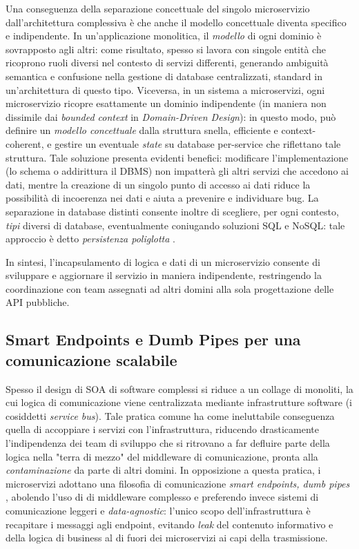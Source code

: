 Una conseguenza della separazione concettuale del singolo microservizio dall'architettura complessiva è che anche il modello concettuale diventa specifico e indipendente. In un'applicazione monolitica, il \emph{modello} di ogni dominio è sovrapposto agli altri: come risultato, spesso si lavora con singole entità che ricoprono ruoli diversi nel contesto di servizi differenti, generando ambiguità semantica e confusione nella gestione di database centralizzati, standard in un'architettura di questo tipo.
Viceversa, in un sistema a microservizi, ogni microservizio ricopre esattamente un dominio indipendente (in maniera non dissimile dai \emph{bounded context} in \emph{Domain-Driven Design}): in questo modo, può definire un \emph{modello concettuale} dalla struttura snella, efficiente e context-coherent, e gestire un eventuale \emph{state} su database per-service che riflettano tale struttura.
Tale soluzione presenta evidenti benefici: modificare l'implementazione (lo schema o addirittura il DBMS) non impatterà gli altri servizi che accedono ai dati, mentre la creazione di un singolo punto di accesso ai dati riduce la possibilità di incoerenza nei dati e aiuta a prevenire e individuare bug.
La separazione in database distinti consente inoltre di scegliere, per ogni contesto, \emph{tipi} diversi di database, eventualmente coniugando soluzioni SQL e NoSQL: tale approccio è detto \emph{persistenza poliglotta} \cite[p.29]{.NET_Microservices}.

In sintesi, l'incapsulamento di logica e dati di un microservizio consente di sviluppare e aggiornare il servizio in maniera indipendente, restringendo la coordinazione con team assegnati ad altri domini alla sola progettazione delle API pubbliche.

\subsection{Smart Endpoints e Dumb Pipes per una comunicazione scalabile}
Spesso il design di SOA di software complessi si riduce a un collage di monoliti, la cui logica di comunicazione viene centralizzata mediante infrastrutture software (i cosiddetti \emph{service bus}). Tale pratica comune ha come ineluttabile conseguenza quella di accoppiare i servizi con l'infrastruttura, riducendo drasticamente l'indipendenza dei team di sviluppo che si ritrovano a far defluire parte della logica nella "terra di mezzo" del middleware di comunicazione, pronta alla \emph{contaminazione} da parte di altri domini.
In opposizione a questa pratica, i microservizi adottano una filosofia di comunicazione \emph{smart endpoints, dumb pipes} \cite[p.19]{Thesis_microservices}, abolendo l'uso di di middleware complesso e preferendo invece sistemi di comunicazione leggeri e \emph{data-agnostic}: l'unico scopo dell'infrastruttura è recapitare i messaggi agli endpoint, evitando \emph{leak} del contenuto informativo e della logica di business al di fuori dei microservizi ai capi della trasmissione.

